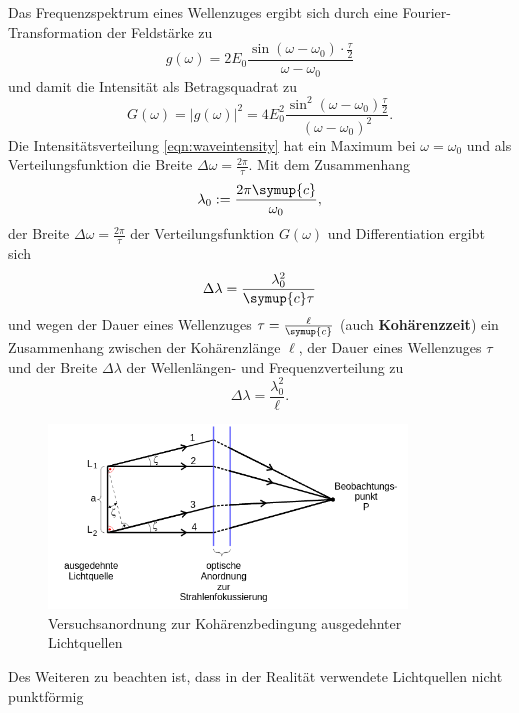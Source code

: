 Das Frequenzspektrum eines Wellenzuges ergibt sich durch eine Fourier-Transformation der
Feldstärke zu
\begin{equation}
	g(\omega) = 2E_0 \frac{\sin{(\omega-\omega_0)\cdot\frac{\tau}{2}}}{\omega-\omega_0}
\end{equation}
und damit die Intensität als Betragsquadrat zu
\begin{equation}
	\label{eqn:waveintensity}
	G(\omega) = |g(\omega)|^2 = 4E_0^2 \frac{\sin^2(\omega-\omega_0)\frac{\tau}{2}}{(\omega- \omega_0)^2} \mathrm{.}
\end{equation}
Die Intensitätsverteilung \eqref{eqn:waveintensity} hat ein Maximum bei $\omega=\omega_0$ und
als Verteilungsfunktion die Breite $\Delta \omega = \frac{2\pi}{\tau}$.
Mit dem Zusammenhang
\begin{equation}
	\lambda_0 := \frac{2\pi \symup{c}}{\omega_0} \mathrm{,}
\end{equation}
der Breite $\Delta \omega = \frac{2\pi}{\tau}$ der Verteilungsfunktion $G(\omega)$ und
Differentiation ergibt sich
\begin{equation}
	\Delta \lambda = \frac{\lambda_0^2}{\symup{c}\tau}
\end{equation}
und wegen der Dauer eines Wellenzuges $\tau = \frac{\ell}{\symup{c}}$
(auch \textbf{Kohärenzzeit}) ein Zusammenhang zwischen der Kohärenzlänge $\ell$, der Dauer
eines Wellenzuges $\tau$ und der Breite $\Delta \lambda$ der Wellenlängen- und Frequenzverteilung zu
\begin{equation}
	\Delta \lambda = \frac{\lambda_0^2}{\ell} \mathrm{.}
\end{equation}
\begin{figure}
	\caption{Versuchsanordnung zur Kohärenzbedingung ausgedehnter Lichtquellen}
	\label{fig:...}
	\centering
	\includegraphics[width=0.85\textwidth]{Bilder/ausgedehnte_lichtquelle.png}
\end{figure}
Des Weiteren zu beachten ist, dass in der Realität verwendete Lichtquellen nicht punktförmig
